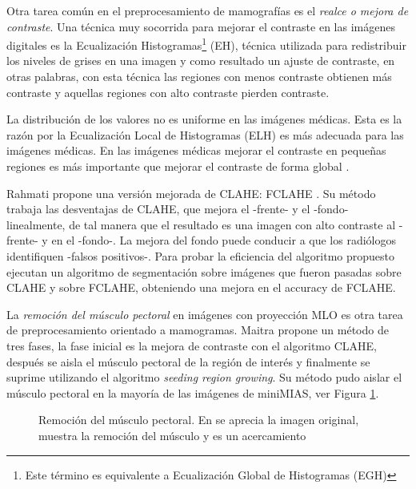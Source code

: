 Otra tarea común en el preprocesamiento de mamografías es el \textit{realce o
mejora de contraste}. Una técnica muy socorrida para mejorar el contraste en
las imágenes digitales es la Ecualización Histogramas\footnote{Este término es
equivalente a Ecualización Global de Histogramas (EGH)} (EH), técnica utilizada
para redistribuir los niveles de grises en una imagen y como resultado un
ajuste de contraste, en otras palabras, con esta técnica las regiones con menos
contraste obtienen más contraste y aquellas regiones con alto contraste pierden
contraste. 

La distribución de los valores no es uniforme en las imágenes médicas. Esta es
la razón por la Ecualización Local de Histogramas (ELH) es más adecuada para
las imágenes médicas. En las imágenes médicas mejorar el contraste en pequeñas
regiones es más importante que mejorar el contraste de forma global
\cite{mohan2013modified}.

Rahmati propone una versión mejorada de CLAHE: FCLAHE \cite{rahmati2010new}. Su
método trabaja las desventajas de CLAHE, que mejora el -frente- y el -fondo-
linealmente, de tal manera que el resultado es una imagen con alto contraste al
-frente- y en el -fondo-. La mejora del fondo puede conducir a que los
radiólogos identifiquen -falsos positivos-. Para probar la eficiencia del
algoritmo propuesto ejecutan un algoritmo de segmentación sobre imágenes que
fueron pasadas sobre CLAHE y sobre FCLAHE, obteniendo una mejora en el accuracy
de FCLAHE.

La \textit{remoción del músculo pectoral} en imágenes con proyección MLO es
otra tarea de preprocesamiento orientado a mamogramas. Maitra propone un método
de tres fases, la fase inicial es la mejora de contraste con el algoritmo
CLAHE, después se aisla el músculo pectoral de la región de interés y
finalmente se suprime utilizando el algoritmo \textit{seeding region growing}.
Su método pudo aislar el músculo pectoral en la mayoría de las imágenes de
miniMIAS, ver Figura \ref{fig:muscle}.

\begin{figure}[h]
    \centering
    \hspace{1cm}
    \hspace{1cm}
  \caption[Remoción del músculo pectoral]
  {Remoción del músculo pectoral. En \protect{} se aprecia la 
  imagen original, \protect{} muestra la remoción del músculo y 
  \protect{} es un acercamiento}
  \label{fig:muscle}
\end{figure}

